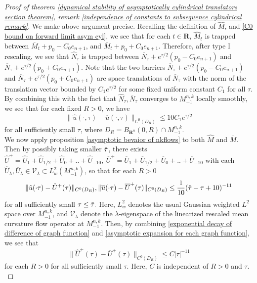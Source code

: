 \documentclass[pdflatex,sn-mathphys-num]{sn-jnl}%
\begin{document}
\begin{proof}[Proof of theorem \ref{dynamical stability of asymptotically cylindrical translators section theorem}, remark \ref{independence of constants to subsequence cylindrical remark}]
We make above argument precise. Recalling the definition of $\hat{M}$, and \eqref{C0 bound on forward limit asym cyl}, we see that for each $t \in \mathbf{R}$, $\hat{M}_t$ is trapped between
$\overline{M}_t + p_0 -C_0e_{n+1}$, and $\overline{M}_t + p_0 + C_0e_{n+1}$. Therefore, after type I rescaling, we see that $\hat{N}_{\tau}$ is trapped between $\overline{N}_{\tau} + e^{\tau/2}(p_0 - C_0e_{n+1})$ and $\overline{N}_{\tau} + e^{\tau/2}(p_0 + C_0e_{n+1})$. Note that the two barriers $\overline{N}_{\tau} + e^{\tau/2}(p_0 - C_0e_{n+1})$ and $\overline{N}_{\tau} + e^{\tau/2}(p_0 + C_0e_{n+1})$ are space translations of $\overline{N}_{\tau}$ with the norm of the translation vector bounded by $C_1e^{\tau/2}$ for some fixed uniform constant $C_1$ for all $\tau$. By combining this with the fact that $\hat{N}_{\tau}, \overline{N}_{\tau}$ converges to $M^{n,k}_{-1}$ locally smoothly, we see that for each fixed $R > 0$, we have
\begin{equation}\label{exponential decay of difference of graph function}
    \|\hat{u}(\cdot, \tau) - \overline{u}(\cdot, \tau)\|_{C^0(D_R)} \leq 10C_1e^{\tau/2}
\end{equation}
for all sufficiently small $\tau$, where $D_R = B_{\mathbf{R}^n}(0, R) \cap M^{n,k}_{-1}$.\\

We now apply proposition \ref{asymptotic bevaior of nkflows} to both $\hat{M}$ and $\overline{M}$. Then by possibly taking smaller $\Tilde{\tau}$, there exists $\hat{U}^+ = \hat{U}_1 + \hat{U}_{1/2} + \hat{U}_0 + .. + \hat{U}_{-10},\  \overline{U}^+ = \overline{U}_1 + \overline{U}_{1/2}+ \overline{U}_0 + .. + \overline{U}_{-10}$ with each $\hat{U}_{\lambda}, \overline{U}_{\lambda} \in \mathcal{V}_{\lambda} \subset L^2_{w}(M^{n,k}_{-1})$, so that for each $R > 0$
\begin{equation}\label{asymptotic expansion for each graph function}
    \|\hat{u}(\cdot \tau) - \hat{U}^+(\tau)\|_{C^{0}(D_R)}, \|\overline{u}(\cdot \tau) - \overline{U}^+(\tau)\|_{C^{0}(D_R)} \leq \frac{1}{10}(\Tilde{\tau} - \tau + 10)^{-11}
\end{equation}
for all sufficiently small $\tau \leq \Tilde{\tau}.$ Here, $L^2_w$ denotes the usual Gaussian weighted $L^2$ space over $M^{n,k}_{-1}$, and $\mathcal{V}_{\lambda}$ denote the $\lambda$-eigenspace of the linearized rescaled mean curvature flow operator at $M^{n,k}_{-1}$. Then, by combining \eqref{exponential decay of difference of graph function} and \eqref{asymptotic expansion for each graph function}, we see that
\begin{equation}\label{diff of asymptotic expansion}
    \|\hat{U}^+(\tau) - \overline{U}^+(\tau)\|_{C^0(D_R)} \leq C|\tau|^{-11}
\end{equation}
for each $R > 0$ for all sufficiently small $\tau$. Here, $C$ is independent of $R > 0$ and $\tau$.\\


\end{proof}
\end{document}
